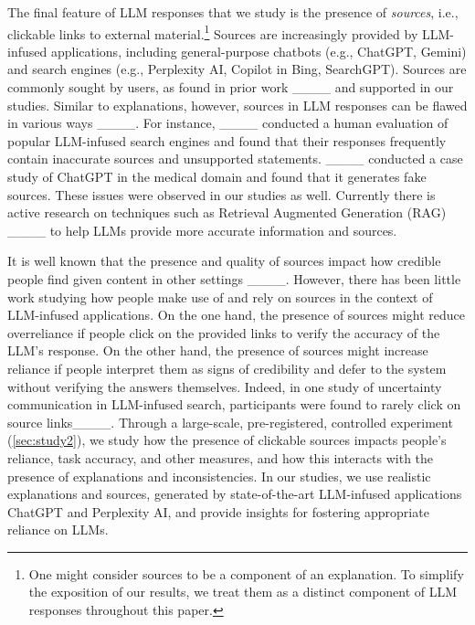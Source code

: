 The final feature of LLM responses that we study is the presence of \emph{sources}, i.e., clickable links to external material.\footnote{One might consider sources to be a component of an explanation. To simplify the exposition of our results, we treat them as a distinct component of LLM responses throughout this paper.} Sources are increasingly provided by LLM-infused applications, including general-purpose chatbots (e.g., ChatGPT, Gemini) and search engines (e.g., Perplexity AI, Copilot in Bing, SearchGPT). Sources are commonly sought by users, as found in prior work ____ and supported in our studies. Similar to explanations, however, sources in LLM responses can be flawed in various ways ____. For instance, ____ conducted a human evaluation of popular LLM-infused search engines and found that their responses frequently contain inaccurate sources and unsupported statements. ____ conducted a case study of ChatGPT in the medical domain and found that it generates fake sources. These issues were observed in our studies as well. Currently there is active research on techniques such as Retrieval Augmented Generation (RAG) ____ to help LLMs provide more accurate information and sources.


It is well known that the presence and quality of sources impact how credible people find given content in other settings ____. However, there has been little work studying how people make use of and rely on sources in the context of LLM-infused applications. On the one hand, the presence of sources might reduce overreliance if people click on the provided links to verify the accuracy of the LLM's response. On the other hand, the presence of sources might increase reliance if people interpret them as signs of credibility and defer to the system without verifying the answers themselves. Indeed, in one study of uncertainty communication in LLM-infused search, participants were found to rarely click on source links____. Through a large-scale, pre-registered, controlled experiment (\cref{sec:study2}), we study how the presence of clickable sources impacts people's reliance, task accuracy, and other measures, and how this interacts with the presence of explanations and inconsistencies. In our studies, we use realistic explanations and sources, generated by state-of-the-art LLM-infused applications ChatGPT and Perplexity AI, and provide insights for fostering appropriate reliance on LLMs. 



